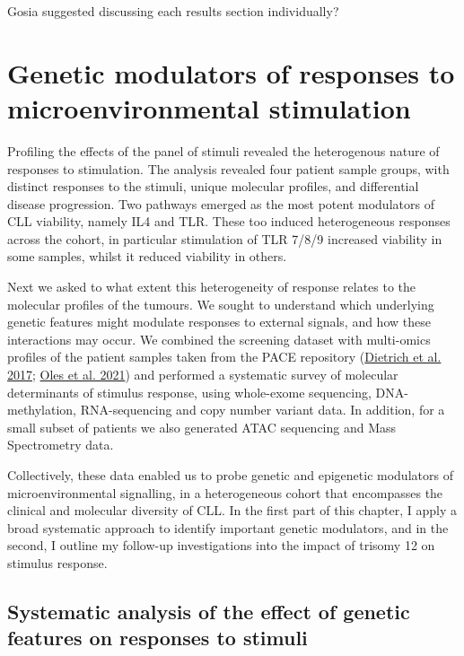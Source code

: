 \documentclass[11pt, a4paper, twosided]{book}
\begin{document}
Gosia suggested discussing each results section individually?

\hypertarget{genetic-modulators-of-responses-to-microenvironmental-stimulation}{%
\chapter{Genetic modulators of responses to microenvironmental stimulation}\label{genetic-modulators-of-responses-to-microenvironmental-stimulation}}

Profiling the effects of the panel of stimuli revealed the heterogenous nature of responses to stimulation. The analysis revealed four patient sample groups, with distinct responses to the stimuli, unique molecular profiles, and differential disease progression. Two pathways emerged as the most potent modulators of CLL viability, namely IL4 and TLR. These too induced heterogeneous responses across the cohort, in particular stimulation of TLR 7/8/9 increased viability in some samples, whilst it reduced viability in others.

Next we asked to what extent this heterogeneity of response relates to the molecular profiles of the tumours. We sought to understand which underlying genetic features might modulate responses to external signals, and how these interactions may occur. We combined the screening dataset with multi-omics profiles of the patient samples taken from the PACE repository (\protect\hyperlink{ref-JCIpaper}{Dietrich et al. 2017}; \protect\hyperlink{ref-R-BloodCancerMultiOmics2017}{Oles et al. 2021}) and performed a systematic survey of molecular determinants of stimulus response, using whole-exome sequencing, DNA-methylation, RNA-sequencing and copy number variant data. In addition, for a small subset of patients we also generated ATAC sequencing and Mass Spectrometry data.

Collectively, these data enabled us to probe genetic and epigenetic modulators of microenvironmental signalling, in a heterogeneous cohort that encompasses the clinical and molecular diversity of CLL. In the first part of this chapter, I apply a broad systematic approach to identify important genetic modulators, and in the second, I outline my follow-up investigations into the impact of trisomy 12 on stimulus response.

\hypertarget{systematic-analysis-of-the-effect-of-genetic-features-on-responses-to-stimuli}{%
\section{Systematic analysis of the effect of genetic features on responses to stimuli}\label{systematic-analysis-of-the-effect-of-genetic-features-on-responses-to-stimuli}}
\end{document}
